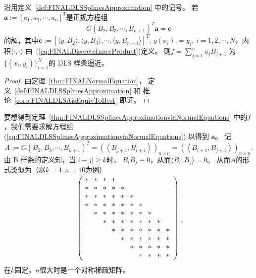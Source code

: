 \begin{thm}
  \label{thm:FINALDLSSplinesApproximationviaNormalEquations}
  沿用定义~\ref{def:FINALDLSSplinesApproximation} 中的记号。
  若$\mathbf{a}:=[a_{1},a_{2},\cdots,a_{n}]^{T}$是正规方程组
  \begin{equation}
    \label{eq:FINALDLSSplinesApproximationviaNormalEquations}
    G(B_{2},B_{3},\cdots,B_{n+1})^{T}\mathbf{a}=\mathbf{c}
  \end{equation}
  的解，其中$\mathbf{c}:=[\langle y,B_{2}\rangle,
  \langle y,B_{3}\rangle,\cdots,\langle y,B_{n+1}\rangle]^{T}$,
  $y(x_{i}):=y_{i},\ i=1,2,\cdots,N$，内积$\langle\cdot,\cdot\rangle$
  由~(\ref{eq:FINALDiscreteInnerProduct})定义。
  则$f=\sum_{j=1}^{n}a_{j}B_{j+1}$
  为$\{(x_{i},y_{i})\}_{i=1}^{N}$的 \textnormal{DLS} 样条逼近。
\end{thm}
\begin{proof}
  由定理~\ref{thm:FINALNormalEquation}，
  定义~\ref{def:FINALDLSSplinesApproximation} 和
  推论~\ref{coro:FINALDLSAisEquivToBest} 即证。
\end{proof}

  要想得到定理~\ref{thm:FINALDLSSplinesApproximationviaNormalEquations} 
  中的$f$，我们需要求解方程组
  (\ref{eq:FINALDLSSplinesApproximationviaNormalEquations}) 以得到
  $\mathbf{a}$。
  记$$A:=G(B_{2},B_{3},\cdots,B_{n+1})^{T}
  =\left(\left\langle B_{j+1}, B_{i+1}\right\rangle\right)_{n\times n}
  =\left(\left\langle B_{i+1}, B_{j+1}\right\rangle\right)_{n\times n}.$$
  由 B 样条的定义知，当$|i-j|\ge k$时，
  $B_{i}B_{j}\equiv0$，从而$\langle B_{i},B_{j}\rangle=0$。
  从而$A$的形式类似为（以$k=4,n=10$为例）
  \begin{displaymath}
    \begin{aligned}
      \begin{pmatrix}
          \ast& \ast& \ast& \ast&     &     &     &     &     &     \\
          \ast& \ast& \ast& \ast& \ast&     &     &     &     &     \\
          \ast& \ast& \ast& \ast& \ast& \ast&     &     &     &     \\
          \ast& \ast& \ast& \ast& \ast& \ast& \ast&     &     &     \\
              & \ast& \ast& \ast& \ast& \ast& \ast& \ast&     &     \\
              &     & \ast& \ast& \ast& \ast& \ast& \ast& \ast&     \\
              &     &     & \ast& \ast& \ast& \ast& \ast& \ast& \ast\\
              &     &     &     & \ast& \ast& \ast& \ast& \ast& \ast\\
              &     &     &     &     & \ast& \ast& \ast& \ast& \ast\\
              &     &     &     &     &     & \ast& \ast& \ast& \ast
      \end{pmatrix}\\
    \end{aligned}
    ,
  \end{displaymath}
  在$k$固定，$n$很大时是一个对称稀疏矩阵。


